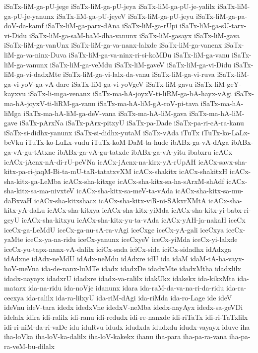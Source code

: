 {iSaTx-liM-ga-pU-jege
iSaTx-liM-ga-pU-jeya
iSaTx-liM-ga-pU-je-yalilx
iSaTx-liM-ga-pU-je-yanunx
iSaTx-liM-ga-pU-jeyeV
iSaTx-liM-ga-pU-jeyu
iSaTx-liM-ga-pa-doV-da-kamf
iSaTx-liM-ga-parx-dAna
iSaTx-liM-ga-rUpi
iSaTx-liM-ga-sU-tarx-vi-Didu
iSaTx-liM-ga-saM-baM-dha-vanunx
iSaTx-liM-gasayx
iSaTx-liM-gava
iSaTx-liM-ga-vanUnx
iSaTx-liM-ga-va-nanx-lalxde
iSaTx-liM-ga-vanenx
iSaTx-liM-ga-va-ninx-Duva
iSaTx-liM-ga-va-ninx-ri-si-koMDu
iSaTx-liM-ga-vanu
iSaTx-liM-ga-vanunx
iSaTx-liM-ga-veMdu
iSaTx-liM-gaveV
iSaTx-liM-ga-vi-Didu
iSaTx-liM-ga-vi-dadxMte
iSaTx-liM-ga-vi-lalx-da-vanu
iSaTx-liM-ga-vi-ruva
iSaTx-liM-ga-vi-yoV-ga-vA-dare
iSaTx-liM-ga-vi-yoVgeV
iSaTx-liM-gavu
iSaTx-liM-geY-kayxvu
iSaTx-li-mga-venanx
iSaTx-ma-hA-joyxV-ti-liRM-ga-bA-hayx-vAgi
iSaTx-ma-hA-joyxV-ti-liRM-ga-vanu
iSaTx-ma-hA-liM-gA-roV-pi-tava
iSaTx-ma-hA-liMga
iSaTx-ma-hA-liM-ga-deV-vana
iSaTx-ma-hA-liM-gava
iSaTx-ma-hA-liM-gave
iSaTx-pArxNa
iSaTx-pArx-pitxyU
iSaTx-pa-Dade
iSaTx-pa-ri-cA-ra-kanu
iSaTx-si-didhx-yanunx
iSaTx-si-didhx-yutaM
iSaTx-vAda
iTuTx
iTuTx-ko-LaLx-beVku
iTuTx-ko-LuLx-vudu
iTuTx-koM-DaM-ta-hude
ibABx-ga-vA-dAga
ibABx-ga-vA-gu-tAtxne
ibABx-ga-vA-gu-tatxde
ibABx-ga-vA-yitu
ibabxru
icACx
icACx-jAcnx-nA-di-rU-peVNa
icACx-jAcnx-na-kirx-yA-rUpAH
icACx-savx-sha-kitx-pa-ri-jaqM-Bi-ta-mU-taR-tatatxvXM
icACx-shakitx
icACx-shakitxH
icACx-sha-kitx-ga-LeMba
icACx-sha-kitxge
icACx-sha-kitx-sa-ha-sArxM-shAdf
icACx-sha-kitx-sa-ma-nivxteV
icACx-sha-kitx-sa-meV-ta-vAda
icACx-sha-kitx-sa-mu-daBxvaH
icACx-sha-kitxshacx
icACx-sha-kitx-viR-ni-SAkxrXMtA
icACx-sha-kitx-yA-daLu
icACx-sha-kitxya
icACx-sha-kitx-yiMda
icACx-sha-kitx-yi-babx-ri-geyU
icACx-sha-kitxyu
icACx-sha-kitx-yu-ta-vAda
icACx-yAH-ja-nakaH
iceCx
iceCx-ga-LeMdU
iceCx-ga-nu-sA-ra-vAgi
iceCxge
iceCx-yA-gali
iceCxya
iceCx-yaMte
iceCx-ya-na-ridu
iceCx-yanunx
iceCxyeV
iceCx-yiMda
iceCx-yi-lalxde
iceCx-yu-tapx-nanx-vA-dalilx
iciCx-sada
iciCx-sida
iciCx-sidadhx
idAdxga
idAdxne
idAdx-neMdU
idAdx-neMdu
idAdxre
idU
ida
idaM
idaM-tA-ha-vayx-hoV-meVna
ida-de-nanx-luMTe
idadx
idadxDe
idadxMte
idadxMtha
idadxlilx
idadx-nayayx
idadxrU
idadxre
idadx-va-ralilx
idakUkx
idakekx
ida-kikxMta
ida-matarx
ida-na-ridu
ida-noVje
idanunx
idara
ida-raM-da-va-na-ri-da-ridu
ida-ra-cecxya
ida-ralilx
ida-ra-lilxyU
ida-riM-dAgi
ida-riMda
ida-ro-Lage
ide
ideV
ideVnu
ideV-tara
idedx
idedxVne
idedxV-neMba
idedx-nayAyx
idedx-sa-geVDi
idelalx
idira
idi-ralilx
idi-ranu
idi-redudx
idi-re-nanxde
idi-riTaTx
idi-ri-TaTxlilx
idi-ri-niM-da-ri-vaDe
idu
iduRvu
idudx
idudxda
idudxdu
idudx-vayayx
iduve
iha
iha-loVka
iha-loV-ka-dalilx
iha-loV-kakekx
ihanu
iha-para
iha-pa-ra-vana
iha-pa-ra-veM-bu-dilalx
}
